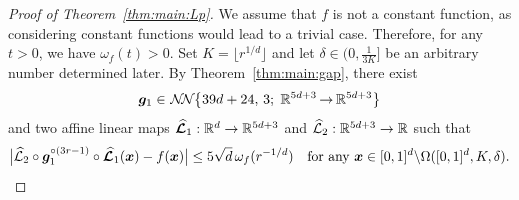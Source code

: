 \documentclass[nohyperref]{article}
\theoremstyle{plain}
\theoremstyle{definition}
\theoremstyle{remark}
\begin{document}
\begin{proof}[Proof of Theorem~\ref{thm:main:Lp}]		
 We assume that $f$ is not a constant function, as considering constant functions would lead to a trivial case. Therefore, for any $t > 0$, we have $\omega_f(t) > 0$.
Set $K=\lfloor r^{1/d}\rfloor$ and let $\delta\in (0,\tfrac{1}{3K}]$ be an arbitrary number  determined later.
	By Theorem~\ref{thm:main:gap}, 	there exist \begin{equation*}
	    \bmg_1\in \nn[\big]{39d+24}{3}{5d+3}{5d+3}
	\end{equation*}
and two affine linear maps $\bmhatcalL_1:\R^d\to\R^{5d+3}$ and $\hatcalL_2:\R^{5d+3}\to\R$
	such that 
	\begin{equation}
    \label{eq:approx:outside}
		\big|{\mathcal{\widehat{L}}}_2\circ {\bm{g}}_1^{\circ (3r-1)}\circ {\bm{\mathcal{\widehat{L}}}}_1({\bm{x}})-f({\bm{x}})\big|\le 5\sqrt{d}\,\omega_f(r^{-1/d})\quad \textnormal{for any ${\bm{x}}\in [0,1]^d\backslash\Omega([0,1]^d,K,\delta)$}.
	\end{equation}



\end{proof}
\end{document}
